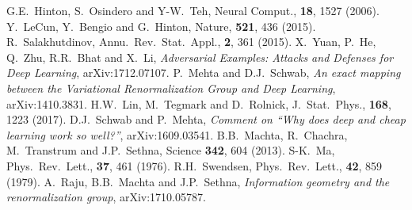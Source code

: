 \documentclass[reprint,amsmath,amssymb,aps]{revtex4-1}
\begin{document}
\begin{thebibliography}{99}
 G.E.\ Hinton, S.\ Osindero and Y-W.\ Teh, Neural Comput., {\bf 18}, 1527 (2006).
 Y.\ LeCun, Y.\ Bengio and G.\ Hinton, Nature, {\bf 521}, 436 (2015).
 R.\ Salakhutdinov, Annu.\ Rev.\ Stat.\ Appl., {\bf 2}, 361 (2015).
 X.\ Yuan, P.\ He, Q.\ Zhu, R.R.\ Bhat and X.\ Li, {\it Adversarial Examples: Attacks and Defenses for Deep Learning}, arXiv:1712.07107.
 P.\ Mehta and D.J.\ Schwab, {\it An exact mapping between the Variational Renormalization Group and Deep Learning}, arXiv:1410.3831.
 H.W.\ Lin, M.\ Tegmark and D.\ Rolnick, J.\ Stat.\ Phys., {\bf 168}, 1223 (2017).
 D.J.\ Schwab and P.\ Mehta, {\it Comment on ``Why does deep and cheap learning work so well?''}, arXiv:1609.03541.
 B.B.\ Machta, R.\ Chachra, M.\ Transtrum and J.P.\ Sethna, Science {\bf 342}, 604 (2013).
 S-K.\ Ma, Phys.\ Rev.\ Lett., {\bf 37}, 461 (1976).
 R.H.\ Swendsen, Phys.\ Rev.\ Lett., {\bf 42}, 859 (1979).
 A.\ Raju, B.B.\ Machta and J.P.\ Sethna, {\it Information geometry and the renormalization group}, arXiv:1710.05787.
\end{thebibliography}
\end{document}
